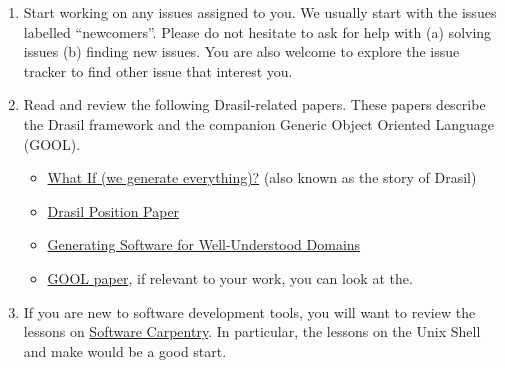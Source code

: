 \documentclass[12pt]{article}
\begin{document}
\begin{enumerate}
\begin{itemize}
\item Coursera course on
\href{https://www.coursera.org/learn/programming-languages} {Programming
Languages, Part A} (The course isn't specifically on Haskell, but the languages
used are similar enough)

\item McMaster Univ
\href{https://www.youtube.com/watch?v=eGwR_MiIT_A&list=PLknslYp7IpnJYHyJd02cOsp0ZBKxWBXK9}
{Comp Sci 1JC3 online lectures}

\item McMaster Univ
\href{https://www.youtube.com/watch?v=7WxbuAztuFs&list=PLHRF-X-NtQR4MZBvm05NshPIEI8ELID5m}
{Comp Sci 1JC3 online tutorials}

\end{itemize}

\item Start working on any issues assigned to you.  We usually start with the
issues labelled ``newcomers''.  Please do not hesitate to ask for help with (a)
solving issues (b) finding new issues.  You are also welcome to explore the
issue tracker to find other issue that interest you.

\item Read and review the following Drasil-related papers.  These papers
describe the Drasil framework and the companion Generic Object Oriented Language
(GOOL).

\begin{itemize}

\item \href{https://github.com/JacquesCarette/Drasil/wiki/What-If} {What If (we
generate everything)?} (also known as the story of Drasil)

\item
\href{https://gitlab.cas.mcmaster.ca/smiths/pub/-/blob/master/SzymczakEtAl2016.pdf}
{Drasil Position Paper}

\item \href{https://arxiv.org/abs/2302.00740} {Generating Software for
Well-Understood Domains}

\item \href{https://arxiv.org/abs/1911.11824} {GOOL paper}, if relevant to
your work, you can look at the.

\end{itemize}

\item If you are new to software development tools, you will want to review the
lessons on \href{http://software-carpentry.org/lessons/} {Software Carpentry}.
In particular, the lessons on the Unix Shell and make would be a good start.


\end{enumerate}
\end{document}

